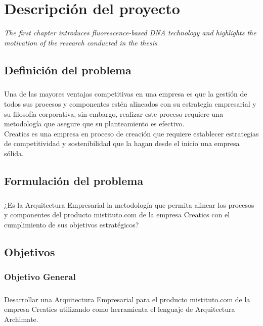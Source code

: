\chapter{Descripción del proyecto}
\label{chap:Problema}
\textit{The first chapter introduces fluorescence-based DNA technology and highlights the motivation of the research conducted in the thesis}
\vfill
\minitoc
\newpage

\section{Definición del problema}
  \paragraph*{}
  Una de las mayores ventajas competitivas en una empresa es que la gestión de todos sus procesos y componentes estén alineados con su estrategia empresarial y su filosofía corporativa, sin embargo, realizar este proceso requiere una metodología que asegure que su planteamiento es efectivo. \\
  Creatics es una empresa en proceso de creación que requiere establecer estrategias de competitividad y sostenibilidad que la hagan desde el inicio una empresa sólida.

\section{Formulación del problema}
  \paragraph*{}
  ¿Es la Arquitectura Empresarial la metodología que permita alinear los procesos y componentes del producto mistituto.com de la empresa Creatics con el cumplimiento de sus objetivos estratégicos?

\section{Objetivos}
  \subsection{Objetivo General}
    \paragraph*{}
    Desarrollar una Arquitectura Empresarial para el producto mistituto.com de la empresa Creatics utilizando como herramienta el lenguaje de Arquitectura Archimate.

